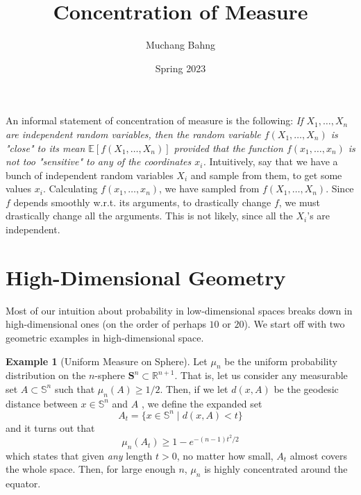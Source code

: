 \documentclass{article}
\theoremstyle{definition}
\newtheorem{example}{Example}[section]
\theoremstyle{remark}
\theoremstyle{definition}
\begin{document}
\pagestyle{fancy}

\cfoot{\thepage / \pageref{LastPage}}

\title{Concentration of Measure}
\author{Muchang Bahng}
\date{Spring 2023}

\maketitle

An informal statement of concentration of measure is the following: \textit{If $X_1, \ldots, X_n$ are independent random variables, then the random variable $f(X_1, \ldots, X_n)$ is "close" to its mean $\mathbb{E}[f(X_1, \ldots, X_n)]$ provided that the function $f(x_1, \ldots, x_n)$ is not too "sensitive" to any of the coordinates $x_i$.} Intuitively, say that we have a bunch of independent random variables $X_i$ and sample from them, to get some values $x_i$. Calculating $f(x_1, \ldots, x_n)$, we have sampled from $f(X_1, \ldots, X_n)$. Since $f$ depends smoothly w.r.t. its arguments, to drastically change $f$, we must drastically change all the arguments. This is not likely, since all the $X_i$'s are independent. 

\section{High-Dimensional Geometry}

Most of our intuition about probability in low-dimensional spaces breaks down in high-dimensional ones (on the order of perhaps $10$ or $20$). We start off with two geometric examples in high-dimensional space. 

\begin{example}[Uniform Measure on Sphere]
Let $\mu_n$ be the uniform probability distribution on the $n$-sphere $\mathbf{S}^{n} \subset \mathbb{R}^{n+1}$. That is, let us consider any measurable set $A \subset \mathbb{S}^{n}$ such that $\mu_n (A) \geq 1/2$. Then, if we let $d(x, A)$ be the geodesic distance between $x \in \mathbb{S}^n$ and $A$ , we define the expanded set 
\[A_t = \{x \in \mathbb{S}^n \mid d(x, A) < t\}\]
and it turns out that 
\[\mu_n (A_t) \geq 1 - e^{- (n -1) t^2 / 2}\]
which states that given \textit{any} length $t > 0$, no matter how small, $A_t$ almost covers the whole space. Then, for large enough $n$, $\mu_n$ is highly concentrated around the equator. 
\end{example}
\end{document}
